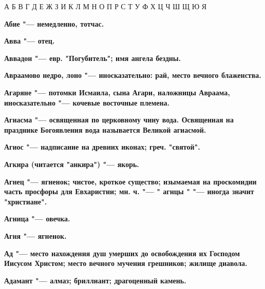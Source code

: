 





А
Б
В
Г
Д
Е
Ж
З
И
К
Л
М
Н
О
П
Р
С
Т
У
Ф
Х
Ц
Ч
Ш
Щ
Ю
Я





\bfseries Абие \normalfont{} "--- немедленно, тотчас. 




\bfseries Авва \normalfont{} "--- отец. 




\bfseries Аввадон \normalfont{} "--- евр. "Погубитель"; имя ангела бездны. 




\bfseries Авраамово недро, лоно \normalfont{} "--- иносказательно: рай, место вечного блаженства. 




\bfseries Агаряне \normalfont{} "--- потомки Исмаила, сына Агари, наложницы Авраама, иносказательно "--- кочевые восточные племена. 




\bfseries Агиасма \normalfont{} "--- освященная по церковному чину вода. Освященная на празднике Богоявления вода называется Великой агиасмой. 




\bfseries Агиос \normalfont{} "--- надписание на древних иконах; греч. "святой". 




\bfseries Агкира \normalfont{} (читается "анкира") "--- якорь. 




\bfseries Агнец \normalfont{} "--- ягненок; чистое, кроткое существо; изымаемая на проскомидии часть просфоры для Евхаристии; мн. ч. "--- " \bfseries агнцы \normalfont{}" "--- иногда значит "христиане". 




\bfseries Агница \normalfont{} "--- овечка. 




\bfseries Агня \normalfont{} "--- ягненок. 




\bfseries Ад \normalfont{} "--- место нахождения душ умерших до освобождения их Господом Иисусом Христом; место вечного мучения грешников; жилище диавола. 




\bfseries Адамант \normalfont{} "--- алмаз; бриллиант; драгоценный камень. 




